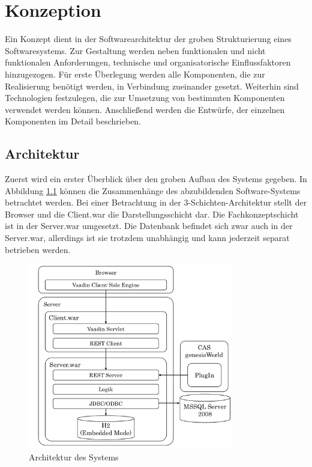 
\chapter{Konzeption}
\label{ch:Konzeption}

Ein Konzept dient in der Softwarearchitektur der groben Strukturierung eines Softwaresystems. Zur Gestaltung werden neben funktionalen und nicht funktionalen Anforderungen, technische und organisatorische Einflussfaktoren hinzugezogen. Für erste Überlegung werden alle Komponenten, die zur Realisierung benötigt werden, in Verbindung zueinander gesetzt. Weiterhin sind Technologien festzulegen, die zur Umsetzung von bestimmten Komponenten verwendet werden können. Anschließend werden die Entwürfe, der einzelnen Komponenten im Detail beschrieben.  

\section{Architektur}

Zuerst wird ein erster Überblick über den groben Aufbau des Systems gegeben. In Abbildung \ref{konzept_architektur} können die Zusammenhänge des abzubildenden Software-Systems betrachtet werden. Bei einer Betrachtung in der 3-Schichten-Architektur stellt der Browser und die Client.war die Darstellungsschicht dar. Die Fachkonzeptschicht ist in der Server.war umgesetzt. Die Datenbank befindet sich zwar auch in der Server.war, allerdings ist sie trotzdem unabhängig und kann jederzeit separat betrieben werden.

\begin{figure}[htbp]
\centering
  \includegraphics[width=0.8\textwidth, width=0.8\textwidth]{pics/Konzept_architektur.pdf}
\caption{Architektur des Systems}
\label{konzept_architektur}
\end{figure} 

